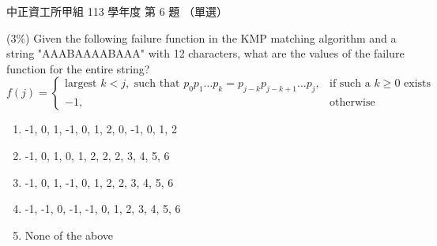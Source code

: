 \begin{pastexam}[label={px:ccu-113-swa-06}]{中正資工所甲組 113 學年度 第 6 題}
（單選）

(3\%) Given the following failure function in the KMP matching algorithm and a string "AAABAAAABAAA" with 12 characters, what are the values of the failure function for the entire string?
\[
f(j)=\begin{cases}\text{largest } k<j, \text{ such that } p_0p_1\ldots p_k=p_{j-k}p_{j-k+1}\ldots p_j, & \text{if such a } k\ge 0 \text{ exists}\\ -1, & \text{otherwise}\end{cases}
\]
\begin{enumerate}[label=\Alph*.]
\item -1, 0, 1, -1, 0, 1, 2, 0, -1, 0, 1, 2
\item -1, 0, 1, 0, 1, 2, 2, 2, 3, 4, 5, 6
\item -1, 0, 1, -1, 0, 1, 2, 2, 3, 4, 5, 6
\item -1, -1, 0, -1, -1, 0, 1, 2, 3, 4, 5, 6
\item None of the above
\end{enumerate}
\end{pastexam}


